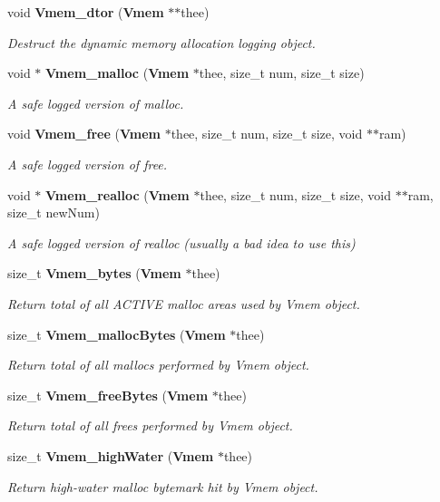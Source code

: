 \begin{DoxyCompactItemize}
void {\bf Vmem\-\_\-dtor} ({\bf Vmem} $\ast$$\ast$thee)
\begin{DoxyCompactList}\small\item\em Destruct the dynamic memory allocation logging object. \end{DoxyCompactList}\item 
void $\ast$ {\bf Vmem\-\_\-malloc} ({\bf Vmem} $\ast$thee, size\-\_\-t num, size\-\_\-t size)
\begin{DoxyCompactList}\small\item\em A safe logged version of malloc. \end{DoxyCompactList}\item 
void {\bf Vmem\-\_\-free} ({\bf Vmem} $\ast$thee, size\-\_\-t num, size\-\_\-t size, void $\ast$$\ast$ram)
\begin{DoxyCompactList}\small\item\em A safe logged version of free. \end{DoxyCompactList}\item 
void $\ast$ {\bf Vmem\-\_\-realloc} ({\bf Vmem} $\ast$thee, size\-\_\-t num, size\-\_\-t size, void $\ast$$\ast$ram, size\-\_\-t new\-Num)
\begin{DoxyCompactList}\small\item\em A safe logged version of realloc (usually a bad idea to use this) \end{DoxyCompactList}\item 
size\-\_\-t {\bf Vmem\-\_\-bytes} ({\bf Vmem} $\ast$thee)
\begin{DoxyCompactList}\small\item\em Return total of all A\-C\-T\-I\-V\-E malloc areas used by Vmem object. \end{DoxyCompactList}\item 
size\-\_\-t {\bf Vmem\-\_\-malloc\-Bytes} ({\bf Vmem} $\ast$thee)
\begin{DoxyCompactList}\small\item\em Return total of all mallocs performed by Vmem object. \end{DoxyCompactList}\item 
size\-\_\-t {\bf Vmem\-\_\-free\-Bytes} ({\bf Vmem} $\ast$thee)
\begin{DoxyCompactList}\small\item\em Return total of all frees performed by Vmem object. \end{DoxyCompactList}\item 
size\-\_\-t {\bf Vmem\-\_\-high\-Water} ({\bf Vmem} $\ast$thee)
\begin{DoxyCompactList}\small\item\em Return high-\/water malloc bytemark hit by Vmem object. \end{DoxyCompactList}\item 
$$
\end{DoxyCompactItemize}
